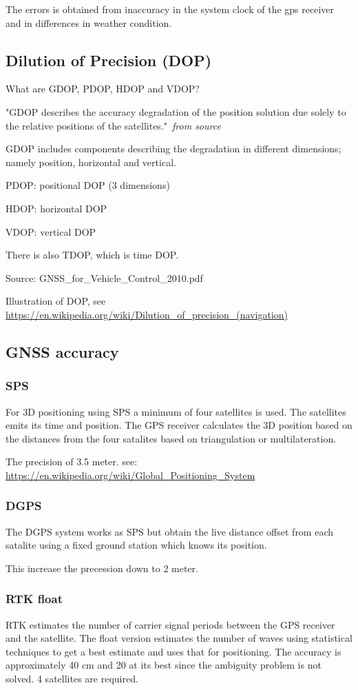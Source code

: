 \documentclass[a4paper,10pt,fleqn]{article}
\begin{document}
The errors is obtained from inaccuracy in the system clock of the gps receiver and in differences in weather condition.

\subsection{Dilution of Precision (DOP)}
What are GDOP, PDOP, HDOP and VDOP?

"GDOP describes the accuracy degradation of the position solution due solely to the relative positions of the satellites."~\textit{from source}

GDOP includes components describing the degradation in different dimensions; namely position, horizontal and vertical.

PDOP: positional DOP (3 dimensions)

HDOP: horizontal DOP

VDOP: vertical DOP

There is also TDOP, which is time DOP.


Source: GNSS\_for\_Vehicle\_Control\_2010.pdf

Illustration of DOP, see \url{https://en.wikipedia.org/wiki/Dilution_of_precision_(navigation)}

\subsection{GNSS accuracy}

\subsubsection{SPS}
For 3D positioning using SPS a minimum of four satellites is used. The satellites emits its time and position. The GPS receiver calculates the 3D position based on the distances from the four satalites based on triangulation or multilateration.

The precision of 3.5 meter. see:  \url{https://en.wikipedia.org/wiki/Global_Positioning_System}

\subsubsection{DGPS}
The DGPS system works as SPS but obtain the live distance offset from each satalite using a fixed ground station which knows its position.

This increase the precession down to 2 meter.

\subsubsection{RTK float}
RTK estimates the number of carrier signal periods between the GPS receiver and the satellite. The float version estimates the number of waves using statistical techniques to get a best estimate and uses that for positioning. The accuracy is approximately 40 cm and 20 at its best since the ambiguity problem is not solved. 4 satellites are required.
\end{document}
